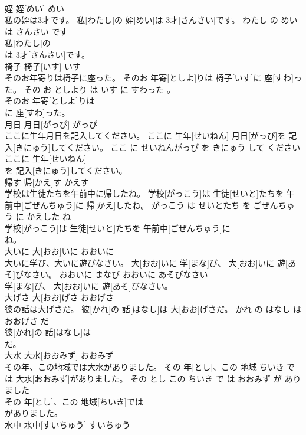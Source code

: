 \documentclass[8pt]{extreport}
\begin{document}
\begin{CJK}{UTF8}{min}
\\	姪	姪[めい]	めい	
\\	私の姪は3才です。	私[わたし]の 姪[めい]は 3才[さんさい]です。	わたし の めい は さんさい です	
\\	私[わたし]の
\\	は 3才[さんさい]です。			
\\	椅子	椅子[いす]	いす	
\\	そのお年寄りは椅子に座った。	そのお 年寄[としよ]りは 椅子[いす]に 座[すわ]った。	その お としより は いす に すわった 。	
\\	そのお 年寄[としよ]りは
\\	に 座[すわ]った。			
\\	月日	月日[がっぴ]	がっぴ	
\\	ここに生年月日を記入してください。	ここに 生年[せいねん] 月日[がっぴ]を 記入[きにゅう]してください。	ここ に せいねんがっぴ を きにゅう して ください	
\\	ここに 生年[せいねん]
\\	を 記入[きにゅう]してください。			
\\	帰す	帰[かえ]す	かえす	
\\	学校は生徒たちを午前中に帰したね。	学校[がっこう]は 生徒[せいと]たちを 午前中[ごぜんちゅう]に 帰[かえ]したね。	がっこう は せいとたち を ごぜんちゅう に かえした ね	
\\	学校[がっこう]は 生徒[せいと]たちを 午前中[ごぜんちゅう]に
\\	ね。			
\\	大いに	大[おお]いに	おおいに	
\\	大いに学び、大いに遊びなさい。	大[おお]いに 学[まな]び、 大[おお]いに 遊[あそ]びなさい。	おおいに まなび おおいに あそびなさい	
\\	学[まな]び、 大[おお]いに 遊[あそ]びなさい。			
\\	大げさ	大[おお]げさ	おおげさ	
\\	彼の話は大げさだ。	彼[かれ]の 話[はなし]は 大[おお]げさだ。	かれ の はなし は おおげさ だ	
\\	彼[かれ]の 話[はなし]は
\\	だ。			
\\	大水	大水[おおみず]	おおみず	
\\	その年、この地域では大水がありました。	その 年[とし]、この 地域[ちいき]では 大水[おおみず]がありました。	その とし この ちいき で は おおみず が ありました	
\\	その 年[とし]、この 地域[ちいき]では
\\	がありました。			
\\	水中	水中[すいちゅう]	すいちゅう	

\end{CJK}
\end{document}
